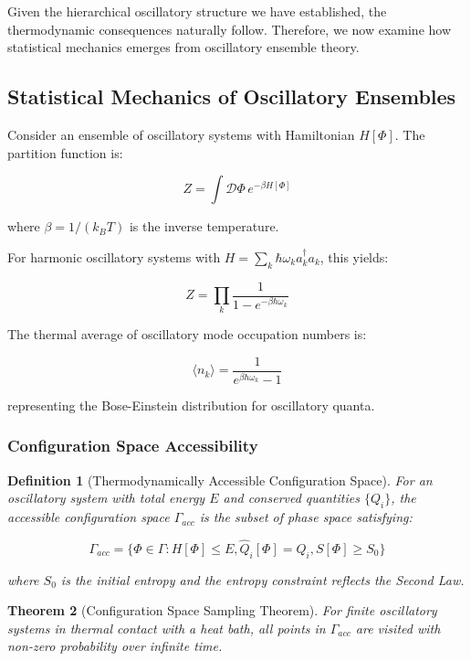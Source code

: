 \documentclass[11pt]{article}
\newtheorem{theorem}{Theorem}[section]
\newtheorem{definition}[theorem]{Definition}
\theoremstyle{remark}
\begin{document}
Given the hierarchical oscillatory structure we have established, the thermodynamic consequences naturally follow. Therefore, we now examine how statistical mechanics emerges from oscillatory ensemble theory.

\subsection{Statistical Mechanics of Oscillatory Ensembles}

Consider an ensemble of oscillatory systems with Hamiltonian $H[\Phi]$. The partition function is:

$$Z = \int \mathcal{D}\Phi \, e^{-\beta H[\Phi]}$$

where $\beta = 1/(k_B T)$ is the inverse temperature.

For harmonic oscillatory systems with $H = \sum_k \hbar\omega_k a_k^\dagger a_k$, this yields:

$$Z = \prod_k \frac{1}{1 - e^{-\beta\hbar\omega_k}}$$

The thermal average of oscillatory mode occupation numbers is:

$$\langle n_k\rangle = \frac{1}{e^{\beta\hbar\omega_k} - 1}$$

representing the Bose-Einstein distribution for oscillatory quanta.

\subsubsection{Configuration Space Accessibility}

\begin{definition}[Thermodynamically Accessible Configuration Space]
For an oscillatory system with total energy $E$ and conserved quantities $\{Q_i\}$, the accessible configuration space $\Gamma_{acc}$ is the subset of phase space satisfying:

$$\Gamma_{acc} = \{\Phi \in \Gamma : H[\Phi] \leq E, \hat{Q}_i[\Phi] = Q_i, S[\Phi] \geq S_0\}$$

where $S_0$ is the initial entropy and the entropy constraint reflects the Second Law.
\end{definition}

\begin{theorem}[Configuration Space Sampling Theorem]
For finite oscillatory systems in thermal contact with a heat bath, all points in $\Gamma_{acc}$ are visited with non-zero probability over infinite time.
\end{theorem}
\end{document}
